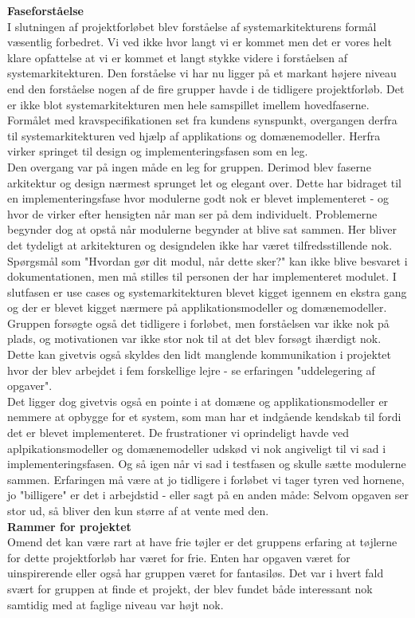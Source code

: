 \textbf{Faseforståelse}\\
I slutningen af projektforløbet blev forståelse af systemarkitekturens formål væsentlig forbedret. Vi ved ikke hvor langt vi er kommet men det er vores helt klare opfattelse at vi er kommet et langt stykke videre i forståelsen af systemarkitekturen. Den forståelse vi har nu ligger på et markant højere niveau end den forståelse nogen af de fire grupper havde i de tidligere projektforløb. Det er ikke blot systemarkitekturen men hele samspillet imellem hovedfaserne. Formålet med kravspecifikationen set fra kundens synspunkt, overgangen derfra til systemarkitekturen ved hjælp af applikations og domænemodeller. Herfra virker springet til design og implementeringsfasen som en leg. \\
Den overgang var på ingen måde en leg for gruppen. Derimod blev faserne arkitektur og design nærmest sprunget let og elegant over. Dette har bidraget til en implementeringsfase hvor modulerne godt nok er blevet implementeret - og hvor de virker efter hensigten når man ser på dem individuelt. Problemerne begynder dog at opstå når modulerne begynder at blive sat sammen. Her bliver det tydeligt at arkitekturen og designdelen ikke har været tilfredsstillende nok. Spørgsmål som "Hvordan gør dit modul, når dette sker?" kan ikke blive besvaret i dokumentationen, men må stilles til personen der har implementeret modulet. I slutfasen er use cases og systemarkitekturen blevet kigget igennem en ekstra gang og der er blevet kigget nærmere på applikationsmodeller og domænemodeller. Gruppen forsøgte også det tidligere i forløbet, men forståelsen var ikke nok på plads, og motivationen var ikke stor nok til at det blev forsøgt ihærdigt nok. Dette kan givetvis også skyldes den lidt manglende kommunikation i projektet hvor der blev arbejdet i fem forskellige lejre - se erfaringen "uddelegering af opgaver".\\
Det ligger dog givetvis også en pointe i at domæne og applikationsmodeller er nemmere at opbygge for et system, som man har et indgående kendskab til fordi det er blevet implementeret. De frustrationer vi oprindeligt havde ved aplpikationsmodeller og domænemodeller udskød vi nok angiveligt til vi sad i implementeringsfasen. Og så igen når vi sad i testfasen og skulle sætte modulerne sammen. Erfaringen må være at jo tidligere i forløbet vi tager tyren ved hornene, jo "billigere" er det i arbejdstid - eller sagt på en anden måde: Selvom opgaven ser stor ud, så bliver den kun større af at vente med den.\\
\textbf{Rammer for projektet}\\
Omend det kan være rart at have frie tøjler er det gruppens erfaring at tøjlerne for dette projektforløb har været for frie. Enten har opgaven været for uinspirerende eller også har gruppen været for fantasiløs. Det var i hvert fald svært for gruppen at finde et projekt, der blev fundet både interessant nok samtidig med at faglige niveau var højt nok.\\

